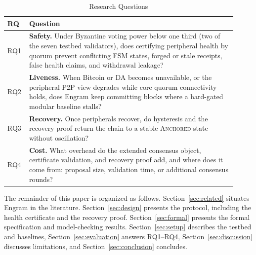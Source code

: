 \begin{table}[h]
\caption{Research Questions}
\label{tab:rq}
\centering
\small
\begin{tabular}{@{}p{0.07\linewidth}p{0.85\linewidth}@{}}
\toprule
\textbf{RQ} & \textbf{Question} \\
\midrule
RQ1 & \textbf{Safety.} Under Byzantine voting power below one third (two of the seven testbed validators), does
certifying peripheral health by quorum prevent conflicting FSM states,
forged or stale receipts, false health claims, and withdrawal leakage? \\
RQ2 & \textbf{Liveness.} When Bitcoin or DA becomes unavailable, or the
peripheral P2P view degrades while core quorum connectivity holds, does
Engram keep committing blocks where a hard-gated modular baseline stalls? \\
RQ3 & \textbf{Recovery.} Once peripherals recover, do hysteresis and the
recovery proof return the chain to a stable \textsc{Anchored} state without
oscillation? \\
RQ4 & \textbf{Cost.} What overhead do the extended consensus object,
certificate validation, and recovery proof add, and where does it come
from: proposal size, validation time, or additional consensus rounds? \\
\bottomrule
\end{tabular}
\end{table}

The remainder of this paper is organized as follows. Section~\ref{sec:related}
situates Engram in the literature. Section~\ref{sec:design} presents the
protocol, including the health certificate and the recovery proof.
Section~\ref{sec:formal} presents the formal specification and model-checking
results. Section~\ref{sec:setup} describes the testbed and baselines,
Section~\ref{sec:evaluation} answers RQ1--RQ4, Section~\ref{sec:discussion}
discusses limitations, and Section~\ref{sec:conclusion} concludes.
